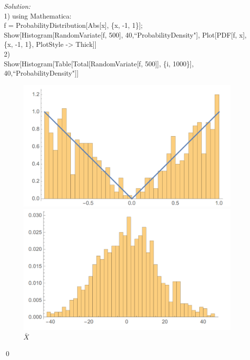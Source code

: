 \documentclass[12pt]{article}
\newenvironment{sol}
    {\emph{Solution:}
    }
    {
    \qed
    }
\begin{document}
\begin{sol}\\
1)  using Mathematica:\\
f = ProbabilityDistribution[Abs[x], \{x, -1, 1\}];\\
Show[Histogram[RandomVariate[f, 500], 40,``ProbabilityDensity"], Plot[PDF[f, x], \{x, -1, 1\}, PlotStyle -> Thick]]\\
2)\\
Show[Histogram[Table[Total[RandomVariate[f, 500]], \{i, 1000\}], 40,``ProbabilityDensity"]]\\
    \begin{figure}[htbp]
        \centering
        \begin{minipage}[t]{0.48\textwidth}
        \centering
        \includegraphics[scale=0.3]{1.png}
        \caption{$X$}
        \label{fig:figure1}
        \end{minipage}
        \begin{minipage}[t]{0.48\textwidth}
        \centering
        \includegraphics[scale=0.4]{2.png}
        \caption{$\bar{X}$}
        \label{fig:figure2}
        \end{minipage}
    \end{figure}
\end{sol}\\



\end{document}
